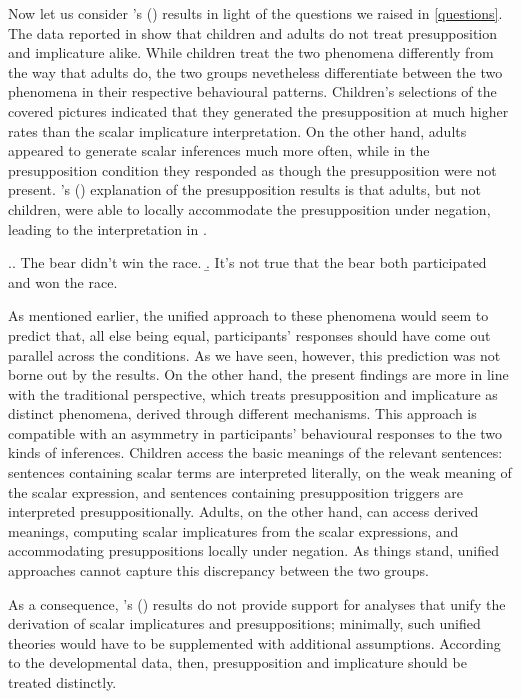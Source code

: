 \documentclass[12pt, letterpaper]{article}
\newcommand\posscite[1]{\citeauthor{#1}'s (\citeyear{#1})}
\begin{document}
Now let us consider \posscite{Bill:2014b} results in light of the questions we raised in \ref{questions}. The data reported in \cite{Bill:2014b} show that children and adults do not treat presupposition and implicature alike. While children treat the two phenomena differently from the way that adults do, the two groups nevetheless differentiate between the two phenomena in their respective behavioural patterns. Children's selections of the covered pictures indicated that they generated the presupposition at much higher rates than the scalar implicature interpretation. On the other hand, adults appeared to generate scalar inferences much more often, while in the presupposition condition they responded as though the presupposition were not present. \posscite{Bill:2014b} explanation of the presupposition results is that adults, but not children, were able to locally accommodate the presupposition under negation, leading to the interpretation in \Next[b].

\ex.\a. The bear didn't win the race.
\b.  It's not true that the bear both participated and won the race.

As mentioned earlier, the unified approach to these phenomena would seem to predict that, all else being equal, participants' responses should have come out parallel across the conditions. As we have seen, however, this prediction was not borne out by the results. On the other hand, the present findings are more in line with the traditional perspective, which treats presupposition and implicature as distinct phenomena, derived through different mechanisms. This approach is compatible with an asymmetry in participants' behavioural responses to the two kinds of inferences. Children access the basic meanings of the relevant sentences: sentences containing scalar terms are interpreted literally, on the weak meaning of the scalar expression, and sentences containing presupposition triggers are interpreted presuppositionally. Adults, on the other hand, can access derived meanings, computing scalar implicatures from the scalar expressions, and accommodating presuppositions locally under negation. As things stand, unified approaches cannot capture this discrepancy between the two groups.

As a consequence, \posscite{Bill:2014b} results do not provide support for analyses that unify the derivation of scalar implicatures and presuppositions; minimally, such unified theories would have to be supplemented with additional assumptions. According to the developmental data, then, presupposition and implicature should be treated distinctly.
\end{document}
